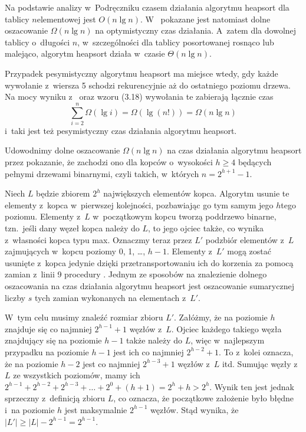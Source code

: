 \exercise %
Na podstawie analizy w~Podręczniku czasem działania algorytmu heapsort dla tablicy $n$\nbhyphen elementowej jest $O(n\lg n)$.
W~ pokazane jest natomiast dolne oszacowanie $\Omega(n\lg n)$ na optymistyczny czas działania.
A~zatem dla dowolnej tablicy o~długości $n$, w~szczególności dla tablicy posortowanej rosnąco lub malejąco, algorytm heapsort działa w~czasie $\Theta(n\lg n)$.

\exercise %
Przypadek pesymistyczny algorytmu heapsort ma miejsce wtedy, gdy każde wywołanie  z~wiersza 5 schodzi rekurencyjnie aż do ostatniego poziomu drzewa.
Na mocy wyniku z~ oraz wzoru (3.18) wywołania te zabierają łącznie czas
\[
	\sum_{i=2}^n\Omega(\lg i) = \Omega(\lg(n!)) = \Omega(n\lg n)
\]
i~taki jest też pesymistyczny czas działania algorytmu heapsort.

\exercise %
Udowodnimy dolne oszacowanie $\Omega(n\lg n)$ na czas działania algorytmu heapsort przez pokazanie, że zachodzi ono dla kopców o~wysokości $h\ge4$ będących pełnymi drzewami binarnymi, czyli takich, w~których $n=2^{h+1}-1$.

Niech $L$ będzie zbiorem $2^h$ największych elementów kopca.
Algorytm usunie te elementy z~kopca w~pierwszej kolejności, pozbawiając go tym samym jego $h$\nbhyphen tego poziomu.
Elementy z~$L$ w~początkowym kopcu tworzą poddrzewo binarne, tzn.\ jeśli dany węzeł kopca należy do $L$, to jego ojciec także, co wynika z~własności kopca typu max.
Oznaczmy teraz przez $L'$ podzbiór elementów z~$L$ zajmujących w~kopcu poziomy 0, 1, \dots, $h-1$.
Elementy z~$L'$ mogą zostać usunięte z~kopca jedynie dzięki przetransportowaniu ich do korzenia za pomocą zamian z~linii 9 procedury .
Jednym ze sposobów na znalezienie dolnego oszacowania na czas działania algorytmu heapsort jest oszacowanie sumarycznej liczby $s$ tych zamian wykonanych na elementach z~$L'$.

W~tym celu musimy znaleźć rozmiar zbioru $L'$.
Załóżmy, że na poziomie $h$ znajduje się co najmniej $2^{h-1}+1$ węzłów z~$L$.
Ojciec każdego takiego węzła znajdujący się na poziomie $h-1$ także należy do $L$, więc w~najlepszym przypadku na poziomie $h-1$ jest ich co najmniej $2^{h-2}+1$.
To z~kolei oznacza, że na poziomie $h-2$ jest co najmniej $2^{h-3}+1$ węzłów z~$L$ itd.
Sumując węzły z~$L$ ze wszystkich poziomów, mamy ich $2^{h-1}+2^{h-2}+2^{h-3}+\dots+2^0+(h+1)=2^h+h>2^h$.
Wynik ten jest jednak sprzeczny z~definicją zbioru $L$, co oznacza, że początkowe założenie było błędne i~na poziomie $h$ jest maksymalnie $2^{h-1}$ węzłów.
Stąd wynika, że $|L'|\ge|L|-2^{h-1}=2^{h-1}$.

